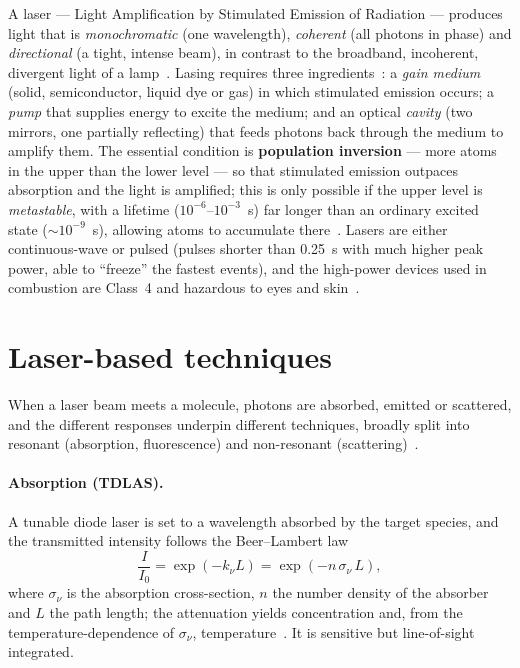 A laser --- Light Amplification by Stimulated Emission of Radiation --- produces light that is \emph{monochromatic} (one wavelength), \emph{coherent} (all photons in phase) and \emph{directional} (a tight, intense beam), in contrast to the broadband, incoherent, divergent light of a lamp~\cite{lecture6,lecture7}. Lasing requires three ingredients~\cite{lecture7}: a \emph{gain medium} (solid, semiconductor, liquid dye or gas) in which stimulated emission occurs; a \emph{pump} that supplies energy to excite the medium; and an optical \emph{cavity} (two mirrors, one partially reflecting) that feeds photons back through the medium to amplify them. The essential condition is \textbf{population inversion} --- more atoms in the upper than the lower level --- so that stimulated emission outpaces absorption and the light is amplified; this is only possible if the upper level is \emph{metastable}, with a lifetime ($10^{-6}$--$10^{-3}$~s) far longer than an ordinary excited state ($\sim10^{-9}$~s), allowing atoms to accumulate there~\cite{lecture7}. Lasers are either continuous-wave or pulsed (pulses shorter than \SI{0.25}{s} with much higher peak power, able to ``freeze'' the fastest events), and the high-power devices used in combustion are Class~4 and hazardous to eyes and skin~\cite{lecture6,lecture7}.

\section{Laser-based techniques}

When a laser beam meets a molecule, photons are absorbed, emitted or scattered, and the different responses underpin different techniques, broadly split into resonant (absorption, fluorescence) and non-resonant (scattering)~\cite{lecture7}.

\paragraph{Absorption (TDLAS).} A tunable diode laser is set to a wavelength absorbed by the target species, and the transmitted intensity follows the Beer--Lambert law
\begin{equation}
\frac{I}{I_0}=\exp(-k_\nu L)=\exp(-n\,\sigma_\nu\,L),
\label{eq:beer-lambert}
\end{equation}
where $\sigma_\nu$ is the absorption cross-section, $n$ the number density of the absorber and $L$ the path length; the attenuation yields concentration and, from the temperature-dependence of $\sigma_\nu$, temperature~\cite{lecture7,hitran}. It is sensitive but line-of-sight integrated.


